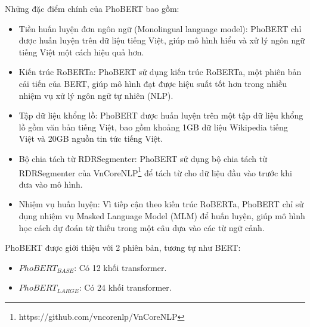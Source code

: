 Những đặc điểm chính của PhoBERT bao gồm:
\begin{itemize}
    \item Tiền huấn luyện đơn ngôn ngữ (Monolingual language model): PhoBERT chỉ được huấn luyện trên dữ liệu tiếng Việt, giúp mô hình hiểu và xử lý ngôn ngữ tiếng Việt một cách hiệu quả hơn.
    \item Kiến trúc RoBERTa: PhoBERT sử dụng kiến trúc RoBERTa, một phiên bản cải tiến của BERT, giúp mô hình đạt được hiệu suất tốt hơn trong nhiều nhiệm vụ xử lý ngôn ngữ tự nhiên (NLP).
    \item Tập dữ liệu khổng lồ: PhoBERT được huấn luyện trên một tập dữ liệu khổng lồ gồm văn bản tiếng Việt, bao gồm khoảng 1GB dữ liệu Wikipedia tiếng Việt và 20GB nguồn tin tức tiếng Việt.
    \item Bộ chia tách từ RDRSegmenter: PhoBERT sử dụng bộ chia tách từ RDRSegmenter của VnCoreNLP\footnote{https://github.com/vncorenlp/VnCoreNLP} để tách từ cho dữ liệu đầu vào trước khi đưa vào mô hình.
    \item Nhiệm vụ huấn luyện: Vì tiếp cận theo kiến trúc RoBERTa, PhoBERT chỉ sử dụng nhiệm vụ Masked Language Model (MLM) để huấn luyện, giúp mô hình học cách dự đoán từ thiếu trong một câu dựa vào các từ ngữ cảnh.
\end{itemize}

PhoBERT được giới thiệu với 2 phiên bản, tương tự như BERT:
\begin{itemize}
    \item $PhoBERT_{BASE}$: Có 12 khối transformer.
    \item $PhoBERT_{LARGE}$: Có 24 khối transformer.
\end{itemize}


